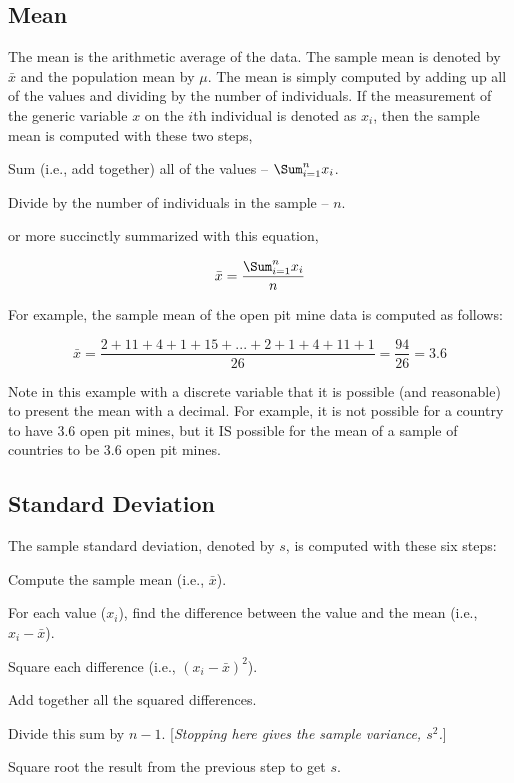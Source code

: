 \documentclass[10pt,openany]{book}\usepackage[]{graphicx}\usepackage[]{color}
\begin{document}

\vspace{-12pt}


\subsection{Mean}
The mean is the arithmetic average of the data. The sample mean is denoted by $\bar{x}$ and the population mean by $\mu$. The mean is simply computed by adding up all of the values and dividing by the number of individuals. If the measurement of the generic variable $x$ on the $i$th individual is denoted as $x_{i}$, then the sample mean is computed with these two steps,
\begin{Enumerate}
  \item Sum (i.e., add together) all of the values -- $\Sum_{i=1}^{n}x_{i}$.
  \item Divide by the number of individuals in the sample -- $n$.
\end{Enumerate}
or more succinctly summarized with this equation,

\begin{equation} \label{eqn:SampleMean}
     \bar{x} = \frac{\Sum_{i=1}^{n}x_{i}}{n}
\end{equation}

For example, the sample mean of the open pit mine data is computed as follows:

\[ \bar{x} = \frac{2+11+4+1+15+ ... +2+1+4+11+1}{26} = \frac{94}{26} = 3.6  \]

Note in this example with a discrete variable that it is possible (and reasonable) to present the mean with a decimal. For example, it is not possible for a country to have 3.6 open pit mines, but it IS possible for the mean of a sample of countries to be 3.6 open pit mines.




\subsection{Standard Deviation}\label{sect:StdDev}
The sample standard deviation, denoted by $s$, is computed with these six steps:
\begin{Enumerate}
  \item Compute the sample mean (i.e., $\bar{x}$).
  \item For each value ($x_{i}$), find the difference between the value and the mean (i.e., $x_{i}-\bar{x}$).
  \item Square each difference (i.e., $(x_{i}-\bar{x})^{2}$).
  \item Add together all the squared differences.
  \item Divide this sum by $n-1$. [\textit{Stopping here gives the sample variance, $s^{2}$.}]
  \item Square root the result from the previous step to get $s$.
\end{Enumerate}
\end{document}
